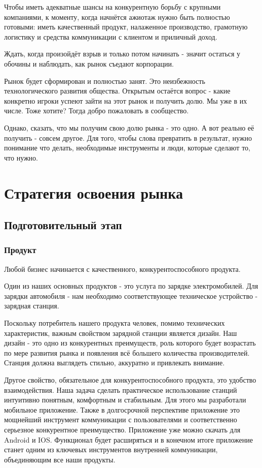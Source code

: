\documentclass[a4paper,12pt]{report}
\begin{document}
Чтобы иметь адекватные шансы на конкурентную борьбу с крупными компаниями, к моменту, когда начнётся ажиотаж нужно быть полностью готовыми: иметь качественный продукт, налаженное производство, грамотную логистику и средства коммуникации с клиентом и приличный доход. 

Ждать, когда произойдёт взрыв и только потом начинать - значит остаться у обочины и наблюдать, как рынок съедают корпорации.

Рынок будет сформирован и полностью занят. Это неизбежность технологического развития общества. Открытым остаётся вопрос - какие конкретно игроки успеют зайти на этот рынок и получить долю. Мы уже в их числе. Тоже хотите? Тогда добро пожаловать в сообщество. 

Однако, сказать, что мы получим свою долю рынка - это одно. А вот реально её получить - совсем другое. Для того, чтобы слова превратить в результат, нужно понимание что делать, необходимые инструменты и люди, которые сделают то, что нужно. 


\chapter{Стратегия освоения рынка}

\section{Подготовительный этап}
\subsection{Продукт}

Любой бизнес начинается с качественного, конкурентоспособного продукта. 

Один из наших основных продуктов - это услуга по зарядке электромобилей. Для зарядки автомобиля - нам необходимо соответствующее техническое устройство - зарядная станция. 

Поскольку потребитель нашего продукта человек, помимо технических характеристик, важным свойством зарядной станции является дизайн. Наш дизайн - это одно из конкурентных преимуществ, роль которого будет возрастать по мере развития рынка и появления всё большего количества производителей. Станция должна выглядеть стильно, аккуратно и привлекать внимание. 

Другое свойство, обязательное для конкурентоспособного продукта, это удобство взаимодействия. Наша задача сделать практическое использование станций интуитивно понятным, комфортным и стабильным. Для этого мы разработали мобильное приложение. Также в долгосрочной перспективе приложение это мощнейший инструмент коммуникации с пользователями и соответственно серьезное конкурентное преимущество. Приложение уже можно скачать для Android и IOS. Функционал будет расширяться и в конечном итоге приложение станет одним из ключевых инструментов внутренней коммуникации, объединяющим все наши продукты. 
\end{document}
